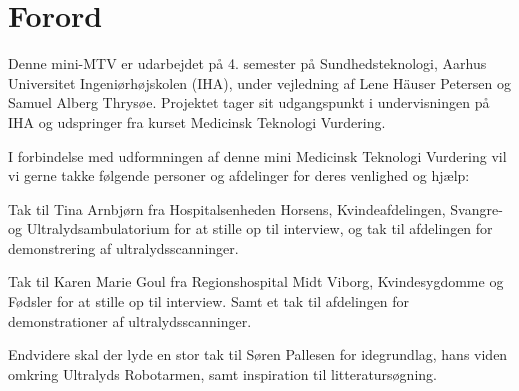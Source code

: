 \chapter{Forord}
Denne mini-MTV er udarbejdet på 4. semester på Sundhedsteknologi, Aarhus Universitet Ingeniørhøjskolen (IHA), under vejledning af Lene Häuser Petersen og Samuel Alberg Thrysøe. Projektet tager sit udgangspunkt i undervisningen på IHA og udspringer fra kurset Medicinsk Teknologi Vurdering. 


I forbindelse med udformningen af denne mini Medicinsk Teknologi Vurdering vil vi gerne takke følgende personer og afdelinger for deres venlighed og hjælp:


Tak til Tina Arnbjørn fra Hospitalsenheden Horsens, Kvindeafdelingen, Svangre- og Ultralydsambulatorium for at stille op til interview, og tak til afdelingen for demonstrering af ultralydsscanninger. 


Tak til Karen Marie Goul fra Regionshospital Midt Viborg, Kvindesygdomme og Fødsler for at stille op til interview. Samt et tak til afdelingen for demonstrationer af ultralydsscanninger. 


Endvidere skal der lyde en stor tak til Søren Pallesen for idegrundlag, hans viden omkring Ultralyds Robotarmen, samt inspiration til litteratursøgning. 

